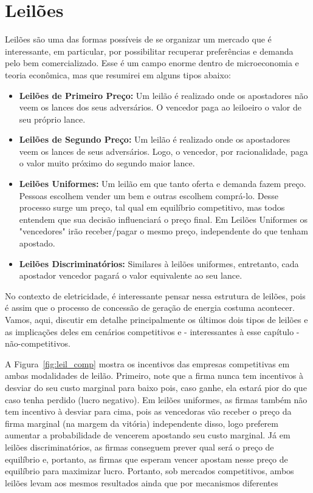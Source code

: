 \section{Leilões}
Leilões são uma das formas possíveis de se organizar um mercado que é interessante, em particular, por possibilitar recuperar preferências e demanda pelo bem comercializado. Esse é um campo enorme dentro de microeconomia e teoria econômica, mas que resumirei em alguns tipos abaixo:
\begin{itemize}
    \item \textbf{Leilões de Primeiro Preço:} Um leilão é realizado onde os apostadores não veem os lances dos seus adversários. O vencedor paga ao leiloeiro o valor de seu próprio lance.
    \item \textbf{Leilões de Segundo Preço:} Um leilão é realizado onde os apostadores veem os lances de seus adversários. Logo, o vencedor, por racionalidade, paga o valor muito próximo do segundo maior lance.
    \item \textbf{Leilões Uniformes:} Um leilão em que tanto oferta e demanda fazem preço. Pessoas escolhem vender um bem e outras escolhem comprá-lo. Desse processo surge um preço, tal qual em equilíbrio competitivo, mas todos entendem que sua decisão influenciará o preço final. Em Leilões Uniformes os "vencedores" irão receber/pagar o mesmo preço, independente do que tenham apostado.
    \item \textbf{Leilões Discriminatórios:} Similares à leilões uniformes, entretanto, cada apostador vencedor pagará o valor equivalente ao seu lance.
\end{itemize}
No contexto de eletricidade, é interessante pensar nessa estrutura de leilões, pois é assim que o processo de concessão de geração de energia costuma acontecer. Vamos, aqui, discutir em detalhe principalmente os últimos dois tipos de leilões e as implicações deles em cenários competitivos e - interessantes à esse capítulo - não-competitivos.

A Figura~\ref{fig:leil_comp} mostra os incentivos das empresas competitivas em ambas modalidades de leilão. Primeiro, note que a firma nunca tem incentivos à desviar do seu custo marginal para baixo pois, caso ganhe, ela estará pior do que caso tenha perdido (lucro negativo). Em leilões uniformes, as firmas também não tem incentivo à desviar para cima, pois as vencedoras vão receber o preço da firma marginal (na margem da vitória) independente disso, logo preferem aumentar a probabilidade de vencerem apostando seu custo marginal. Já em leilões discriminatórios, as firmas conseguem prever qual será o preço de equilíbrio e, portanto, as firmas que esperam vencer apostam nesse preço de equilíbrio para maximizar lucro. Portanto, sob mercados competitivos, ambos leilões levam aos mesmos resultados ainda que por mecanismos diferentes


